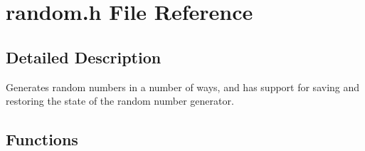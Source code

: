 \section{random.h File Reference}
\label{random_8h}


\subsection{Detailed Description}
Generates random numbers in a number of ways, and has support for saving and restoring the state of the random number generator. 



\subsection*{Functions}
